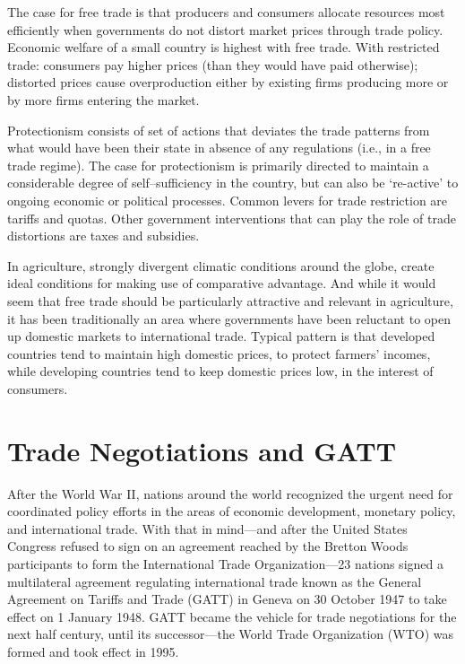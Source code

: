 \documentclass[
  oneside]{book}
\begin{document}
The case for free trade is that producers and consumers allocate resources most efficiently when governments do not distort market prices through trade policy. Economic welfare of a small country is highest with free trade. With restricted trade: consumers pay higher prices (than they would have paid otherwise); distorted prices cause overproduction either by existing firms producing more or by more firms entering the market.

Protectionism consists of set of actions that deviates the trade patterns from what would have been their state in absence of any regulations (i.e., in a free trade regime). The case for protectionism is primarily directed to maintain a considerable degree of self--sufficiency in the country, but can also be `re-active' to ongoing economic or political processes. Common levers for trade restriction are tariffs and quotas. Other government interventions that can play the role of trade distortions are taxes and subsidies.

In agriculture, strongly divergent climatic conditions around the globe, create ideal conditions for making use of comparative advantage. And while it would seem that free trade should be particularly attractive and relevant in agriculture, it has been traditionally an area where governments have been reluctant to open up domestic markets to international trade. Typical pattern is that developed countries tend to maintain high domestic prices, to protect farmers' incomes, while developing countries tend to keep domestic prices low, in the interest of consumers.

\hypertarget{trade-negotiations-and-gatt}{%
\section{Trade Negotiations and GATT}\label{trade-negotiations-and-gatt}}

After the World War II, nations around the world recognized the urgent need for coordinated policy efforts in the areas of economic development, monetary policy, and international trade. With that in mind---and after the United States Congress refused to sign on an agreement reached by the Bretton Woods participants to form the International Trade Organization---23 nations signed a multilateral agreement regulating international trade known as the General Agreement on Tariffs and Trade (GATT) in Geneva on 30 October 1947 to take effect on 1 January 1948. GATT became the vehicle for trade negotiations for the next half century, until its successor---the World Trade Organization (WTO) was formed and took effect in 1995.
\end{document}

